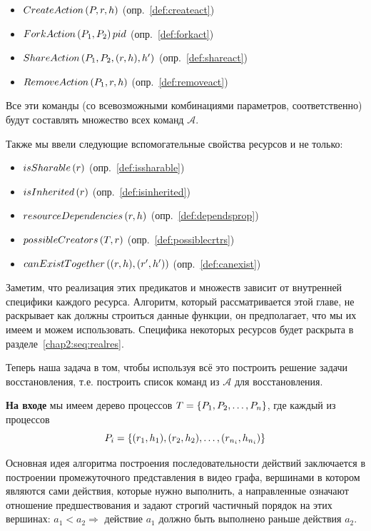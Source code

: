 \begin{itemize}
	\item $CreateAction\left( P, r, h \right)$ (опр.~\ref{def:createact})
	\item $ForkAction\left( P_1, P_2 \right){pid}$ (опр.~\ref{def:forkact})
	\item $ShareAction\left( P_1, P_2, (r, h), h' \right)$ (опр.~\ref{def:shareact})
	\item $RemoveAction\left( P_1, r, h \right)$ (опр.~\ref{def:removeact})
\end{itemize}

Все эти команды (со всевозможными комбинациями параметров, соответственно) будут составлять множество всех команд $\mathcal{A}$.

Также мы ввели следующие вспомогательные свойства ресурсов и не только:

\begin{itemize}
	\item $isSharable\left( r \right)$ (опр.~\ref{def:issharable})
	\item $isInherited\left( r \right)$ (опр.~\ref{def:isinherited})
	\item $resourceDependencies\left( r, h \right)$ (опр.~\ref{def:dependsprop})
	\item $possibleCreators\left( T, r \right)$ (опр.~\ref{def:possiblecrtrs})
	\item $canExistTogether\left( (r, h), (r', h') \right)$ (опр.~\ref{def:canexist})
\end{itemize}

Заметим, что реализация этих предикатов и множеств зависит от внутренней специфики каждого ресурса. Алгоритм, который рассматривается этой главе, не раскрывает как должны строиться данные функции, он предполагает, что мы их имеем и можем использовать. Специфика некоторых ресурсов будет раскрыта в разделе~\ref{chap2:seq:realres}.

Теперь наша задача в том, чтобы используя всё это построить решение задачи восстановления, т.е. построить список команд из $\mathcal{A}$ для восстановления.

\textbf{На входе} мы имеем дерево процессов $T = \left\lbrace P_1, P_2, \ldots, P_n \right\rbrace$, где каждый из процессов 
\begin{equation*}
P_i = \left\lbrace (r_1, h_1), (r_2, h_2), \ldots, (r_{n_i}, h_{n_i}) \right\rbrace
\end{equation*}

Основная идея алгоритма построения последовательности действий заключается в построении промежуточного представления
в видео графа, вершинами в котором являются сами действия, которые нужно выполнить, а направленные означают отношение предшествования и задают строгий частичный порядок на этих вершинах: $a_1 < a_2 \Longrightarrow $ действие $a_1$ должно быть выполнено раньше действия $a_2$.

